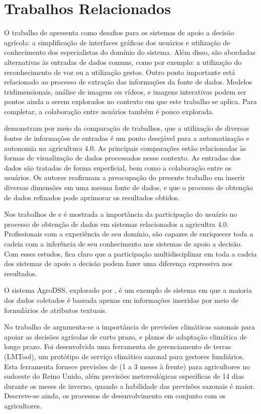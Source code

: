 \documentclass[12pt]{article}
\begin{document}
\section{Trabalhos Relacionados}
\label{sec:trabalhos_relacionados}

O trabalho de  apresenta como desafios para os sistemas de apoio a decisão agrícola: a simplificação de interfaces gráficas dos usuários e utilização de conhecimento dos especialistas do domínio do sistema. Além disso, são abordadas alternativas às entradas de dados comuns, como por exemplo: a utilização do reconhecimento de voz ou a utilização gestos. Outro ponto importante está relacionado ao processo de extração das informações da fonte de dados. Modelos tridimensionais, análise de imagens ou vídeos, e imagens interativas podem ser pontos ainda a serem explorados no contexto em que este trabalho se aplica. Para completar, a colaboração entre usuários também é pouco explorada.

 demonstram por meio da comparação de trabalhos, que a utilização de diversas fontes de informações de entradas é um ponto desejável para a automatização e autonomia na agricultura 4.0. As principais comparações estão relacionadas às formas de visualização de dados processados nesse contexto. As entradas dos dados são tratadas de forma superficial, bem como a colaboração entre os usuários. Os autores reafirmam a preocupação do presente trabalho em inserir diversas dimensões em uma mesma fonte de dados, e que o processo de obtenção de dados refinados pode aprimorar os resultados obtidos.

Nos trabalhos de  e  é mostrada a importância da participação do usuário no processo de obtenção de dados em sistemas relacionados a agricultra 4.0. Profissionais com a experiência de seu domínio, são capazes de enriquecer toda a cadeia com a inferência de seu conhecimento nos sistemas de apoio a decisão. Com esses estudos, fica claro que a participação multidisciplinar em toda a cadeia dos sistemas de apoio a decisão podem fazer uma diferença expressiva nos resultados.

O sistema AgroDSS, explorado por , é um exemplo de sistema em que a maioria dos dados coletados é baseada apenas em informações inseridas por meio de formulários de atributos textuais.

No trabalho de  argumenta-se a importância de previsões climáticas sazonais para apoiar as decisões agrícolas de curto prazo, e planos de adaptação climática de longo prazo. Foi desenvolvida uma ferramenta de gerenciamento de terras (LMTool), um protótipo de serviço climático sazonal para gestores fundiários. Esta ferramenta fornece previsões de (1 a 3 meses à frente) para agricultores no sudoeste do Reino Unido, além previsões metereológicas específicas de 14 dias durante os meses de inverno, quando a habilidade das previsões sazonais é maior. Descreve-se ainda, os processos de desenvolvimento em conjunto com os agricultores.
\end{document}
